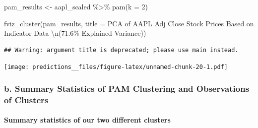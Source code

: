 \documentclass[
]{article}
\newenvironment{Shaded}{\begin{snugshade}}{\end{snugshade}}
\newcommand{\AttributeTok}[1]{\textcolor[rgb]{0.77,0.63,0.00}{#1}}
\newcommand{\CommentTok}[1]{\textcolor[rgb]{0.56,0.35,0.01}{\textit{#1}}}
\newcommand{\DecValTok}[1]{\textcolor[rgb]{0.00,0.00,0.81}{#1}}
\newcommand{\FunctionTok}[1]{\textcolor[rgb]{0.00,0.00,0.00}{#1}}
\newcommand{\NormalTok}[1]{#1}
\newcommand{\OtherTok}[1]{\textcolor[rgb]{0.56,0.35,0.01}{#1}}
\newcommand{\SpecialCharTok}[1]{\textcolor[rgb]{0.00,0.00,0.00}{#1}}
\newcommand{\StringTok}[1]{\textcolor[rgb]{0.31,0.60,0.02}{#1}}
\begin{document}
\begin{Shaded}
\begin{Highlighting}[]
\NormalTok{pam\_results }\OtherTok{\textless{}{-}}\NormalTok{ aapl\_scaled }\SpecialCharTok{\%\textgreater{}\%}
  \FunctionTok{pam}\NormalTok{(}\AttributeTok{k =} \DecValTok{2}\NormalTok{)}

\FunctionTok{fviz\_cluster}\NormalTok{(pam\_results, }\AttributeTok{title =} \StringTok{\textquotesingle{}PCA of AAPL Adj Close Stock Prices Based on Indicator Data }\SpecialCharTok{\textbackslash{}n}\StringTok{(71.6\% Explained Variance)\textquotesingle{}}\NormalTok{)}
\end{Highlighting}
\end{Shaded}

\begin{verbatim}
## Warning: argument title is deprecated; please use main instead.
\end{verbatim}

\texttt{[image: predictions\_\_files/figure-latex/unnamed-chunk-20-1.pdf]}

\hypertarget{b.-summary-statistics-of-pam-clustering-and-observations-of-clusters}{%
\subsubsection{b. Summary Statistics of PAM Clustering and Observations
of
Clusters}\label{b.-summary-statistics-of-pam-clustering-and-observations-of-clusters}}

\hypertarget{summary-statistics-of-our-two-different-clusters}{%
\paragraph{Summary statistics of our two different
clusters}\label{summary-statistics-of-our-two-different-clusters}}

\begin{Shaded}
\end{Shaded}
\end{document}
